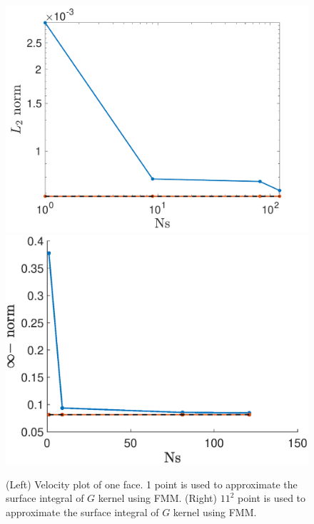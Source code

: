 \begin{figure}[h]
	\begin{center}
		\includegraphics[scale=0.4]{./figures/fig_cornerErr_L2}
		\includegraphics[scale=0.4]{./figures/fig_cornerErr_inf}
	\caption{(Left) Velocity plot of one face. 1 point is used to approximate the surface integral of $G$ kernel using FMM. (Right) $11^2$ point is used to approximate the surface integral of $G$ kernel using FMM. }
	\label{fig_cornerErr}
\end{center}
\end{figure}
